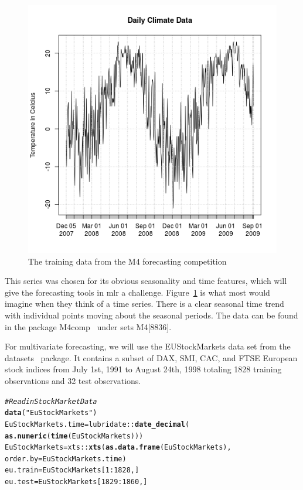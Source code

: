 \documentclass[12pt]{article}\usepackage[]{graphicx}\usepackage[]{color}
\makeatletter
\newcommand{\hlnum}[1]{\textcolor[rgb]{0.686,0.059,0.569}{#1}}%
\newcommand{\hlstr}[1]{\textcolor[rgb]{0.192,0.494,0.8}{#1}}%
\newcommand{\hlcom}[1]{\textcolor[rgb]{0.678,0.584,0.686}{\textit{#1}}}%
\newcommand{\hlopt}[1]{\textcolor[rgb]{0,0,0}{#1}}%
\newcommand{\hlstd}[1]{\textcolor[rgb]{0.345,0.345,0.345}{#1}}%
\newcommand{\hlkwb}[1]{\textcolor[rgb]{0.69,0.353,0.396}{#1}}%
\newcommand{\hlkwc}[1]{\textcolor[rgb]{0.333,0.667,0.333}{#1}}%
\newcommand{\hlkwd}[1]{\textcolor[rgb]{0.737,0.353,0.396}{\textbf{#1}}}%
\newenvironment{kframe}{%
 \def\at@end@of@kframe{}%
 \ifinner\ifhmode%
  \def\at@end@of@kframe{\end{minipage}}%
  \begin{minipage}{\columnwidth}%
 \fi\fi%
 \def\FrameCommand##1{\hskip\@totalleftmargin \hskip-\fboxsep
 \colorbox{shadecolor}{##1}\hskip-\fboxsep
     \hskip-\linewidth \hskip-\@totalleftmargin \hskip\columnwidth}%
 \MakeFramed {\advance\hsize-\width
   \@totalleftmargin\z@ \linewidth\hsize
   \@setminipage}}%
 {\par\unskip\endMakeFramed%
 \at@end@of@kframe}
\newenvironment{knitrout}{}{} %
\theoremstyle{definition}
\newcommand\code{\@codex}
\def\@codex#1{{\normalfont\ttfamily\hyphenchar\font=-1 #1}}
\newcommand{\pkg}[1]{{\fontseries{b}\selectfont #1}}
\makeatother
\begin{document}
\begin{figure}[H]
\includegraphics[width=\linewidth]{plot_m4_train.png}
\centering
\caption{The training data from the M4 forecasting competition}
\label{fig:m4_train}
\end{figure}
\doublespacing
This series was chosen for its obvious seasonality and time features, which will give the forecasting tools in \pkg{mlr} a challenge. Figure~\ref{fig:m4_train} is what most would imagine when they think of a time series. There is a clear seasonal time trend with individual points moving about the seasonal periods. The data can be found in the package \pkg{M4comp}~\cite{m4comp} under sets\code{M4[8836]}.

For multivariate forecasting, we will use the EUStockMarkets data set from the \pkg{datasets}~\cite{datasets} package. It contains a subset of DAX, SMI, CAC, and FTSE European stock indices from July 1st, 1991 to August 24th, 1998 totaling 1828 training observations and 32 test observations.

\singlespace
\begin{knitrout}
\color{fgcolor}\begin{kframe}
\begin{alltt}
\hlcom{# Read in Stock Market Data}
\hlkwd{data}\hlstd{(}\hlstr{"EuStockMarkets"}\hlstd{)}
\hlstd{EuStockMarkets.time} \hlkwb{=} \hlstd{lubridate}\hlopt{::}\hlkwd{date_decimal}\hlstd{(}
                \hlkwd{as.numeric}\hlstd{(}\hlkwd{time}\hlstd{(EuStockMarkets)))}
\hlstd{EuStockMarkets}  \hlkwb{=} \hlstd{xts}\hlopt{::}\hlkwd{xts}\hlstd{(}\hlkwd{as.data.frame}\hlstd{(EuStockMarkets),}
                           \hlkwc{order.by} \hlstd{= EuStockMarkets.time)}
\hlstd{eu.train} \hlkwb{=} \hlstd{EuStockMarkets[}\hlnum{1}\hlopt{:}\hlnum{1828}\hlstd{,]}
\hlstd{eu.test} \hlkwb{=} \hlstd{EuStockMarkets[}\hlnum{1829}\hlopt{:}\hlnum{1860}\hlstd{,]}
\end{alltt}
\end{kframe}
\end{knitrout}
\end{document}
